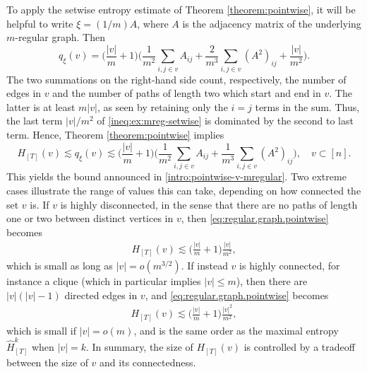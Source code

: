 \documentclass[11pt,reqno]{amsart}
\numberwithin{equation}{section}
\theoremstyle{definition}
\begin{document}
To apply the setwise entropy estimate of Theorem \ref{theorem:pointwise},  it will be helpful to write $\xi=(1/m)A$, where $A$ is the adjacency matrix of the underlying $m$-regular graph. Then
\begin{equation}
q_{\xi}(v) = \Big(\frac{|v|}{m}+1\Big)\bigg(\frac{1}{m^2}\sum_{i,j \in v} A_{ij} +  \frac{2}{m^3}\sum_{i,j \in v} (A^2)_{ij} + \frac{|v|}{m^2}\bigg). \label{ineq:ex:mreg-setwise}
\end{equation}
The two summations on the right-hand side count, respectively, the number of edges in $v$ and the number of paths of length two which start and end in $v$. The latter is at least $m|v|$, as seen by retaining only the $i=j$ terms in the sum. Thus, the last term  $|v|/m^2$ of \eqref{ineq:ex:mreg-setwise} is dominated by the second to last term.
Hence, Theorem \ref{theorem:pointwise} implies 
\begin{equation}\label{eq:regular.graph.pointwise}
H_{[T]}(v) \lesssim q_{\xi}(v) \lesssim \bigg(\frac{|v|}{m} + 1\bigg)\bigg(\frac{1}{m^2} \sum_{i,j \in v} A_{ij} + \frac{1}{m^3}\sum_{i,j \in v} (A^2)_{ij}\bigg), \quad v \subset [n].
\end{equation}
This yields the bound announced in \eqref{intro:pointwise-v-mregular}.
Two extreme cases illustrate the range of values this can take, depending on how connected the set $v$ is. If $v$ is highly disconnected, in the sense that there are no paths of length one or two between distinct vertices in $v$, then  \eqref{eq:regular.graph.pointwise} becomes
\begin{align*}
H_{[T]}(v) \lesssim \bigg(\frac{|v|}{m} + 1\bigg)\frac{|v|}{m^2},
\end{align*}
which is small as long as $|v|=o(m^{3/2})$.
If instead $v$ is highly connected, for instance a clique (which in particular implies $|v| \le m$), then there are $|v|(|v|-1)$  directed edges in $v$, and \eqref{eq:regular.graph.pointwise} becomes
\begin{align*}
H_{[T]}(v) \lesssim \bigg(\frac{|v|}{m} + 1\bigg)\frac{|v|^2}{m^2},
\end{align*}
which  is small if $|v|=o(m)$, and is the same order as the maximal entropy $\widehat{H}^{k}_{[T]}$ when $|v|=k$. In summary, the size of $H_{[T]}(v)$ is controlled by a tradeoff between the size of $v$ and its connectedness.
 
 
 
\end{document}
